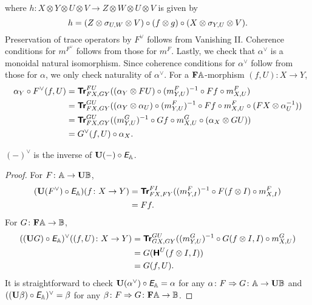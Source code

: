 where \(h \colon X \otimes Y \otimes U \otimes V \to Z \otimes W \otimes U \otimes V\)
is given by
\begin{equation*}
  h = (Z \otimes \sigma_{U,W} \otimes V) \circ (f \otimes g) \circ
  (X \otimes \sigma_{Y,U} \otimes V).
\end{equation*}
Preservation of trace operators by \(F^{\vee}\) follows from Vanishing
II. Coherence conditions for \(m^{F^{\vee}}\) follows from those for
\(m^{F}\). Lastly, we check that \(\alpha^{\vee}\) is a monoidal
natural isomorphism. Since coherence conditions for \(\alpha^{\vee}\)
follow from those for \(\alpha\), we only check naturality of
\(\alpha^{\vee}\). For a \(\mathbf{F}\mathbb{A}\)-morphism \((f,U) \colon X \to
Y\),
\begin{align*}
  \alpha_{Y} \circ F^{\vee}(f,U)
  &= {\normalfont\textsf{\textbf{Tr}}}^{FU}_{FX,GY}((\alpha_{Y} \otimes FU) \circ (m^{F}_{Y,U})^{-1} \circ Ff \circ m^{F}_{X,U}) \\
  &= {\normalfont\textsf{\textbf{Tr}}}^{GU}_{FX,GY}((\alpha_{Y} \otimes \alpha_{U}) \circ (m^{F}_{Y,U})^{-1} \circ Ff \circ m^{F}_{X,U}
  \circ (FX \otimes \alpha^{-1}_{U})) \\
  &= {\normalfont\textsf{\textbf{Tr}}}^{GU}_{FX,GY}((m^{G}_{Y,U})^{-1} \circ Gf \circ m^{G}_{X,U}
  \circ (\alpha_{X} \otimes GU)) \\
  &= G^{\vee} (f,U) \circ \alpha_{X}.
\end{align*}

\begin{proposition}
  \((-)^{\vee}\) is the inverse of \(\mathbf{U}(-) \circ \textit{\textsf{E}}_{\mathbb{A}}\).
\end{proposition}
\begin{proof}
  For \(F \colon \mathbb{A} \to \mathbf{U}\mathbb{B}\),
  \begin{align*}
    (\mathbf{U} (F^{\vee}) \circ \textit{\textsf{E}}_{\mathbb{A}})(f \colon X \to Y)
    &= {\normalfont\textsf{\textbf{Tr}}}^{FI}_{FX,FY} ((m^{F}_{Y,I})^{-1} \circ F(f \otimes I) \circ m^{F}_{X,I}) \\
    &= Ff.
  \end{align*}
  For \(G \colon \mathbf{F}\mathbb{A} \to \mathbb{B}\),
  \begin{align*}
    ((\mathbf{U} G) \circ \textit{\textsf{E}}_{\mathbb{A}})^{\vee}((f,U) \colon X \to Y)
    &= {\normalfont\textsf{\textbf{Tr}}}^{GU}_{GX,GY}((m^{G}_{Y,U})^{-1} \circ G(f \otimes I,I) \circ m^{G}_{X,U}) \\
    &= G({\normalfont\textsf{\textbf{H}}^{U}}(f \otimes I,I)) \\
    &= G(f,U).
  \end{align*}
  It is straightforward to check
  \(\mathbf{U} (\alpha^{\vee}) \circ \textit{\textsf{E}}_{\mathbb{A}} = \alpha\)
  for any \(\alpha \colon F \Rightarrow G \colon \mathbb{A} \to \mathbf{U}\mathbb{B}\)
  and \(((\mathbf{U} \beta) \circ \textit{\textsf{E}}_{\mathbb{A}})^{\vee} = \beta\) 
  for any \(\beta \colon F \Rightarrow G \colon \mathbf{F}\mathbb{A} \to \mathbb{B}\).
\end{proof}

